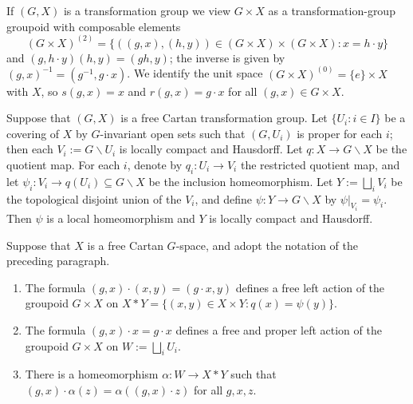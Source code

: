 \documentclass[12pt,a4paper]{amsart}
\newcommand{\under}{\backslash}
\begin{document}
If $(G,X)$ is a transformation group we view $G\times X$ as a
transformation-group groupoid with composable elements
\[
(G\times X)^{(2)}=\big\{ ((g,x),(h,y))\in
(G\times X)\times (G\times X): x=h\cdot y\big\}
\]
and $(g,h\cdot y)(h,y)=(gh,y)$; the inverse is given by
$(g,x)^{-1}=(g^{-1},g\cdot x)$.  We identify the unit space
$(G\times X)^{(0)}=\{e\}\times X$ with $X$, so $s(g,x)=x$ and
$r(g,x)=g\cdot x$ for all $(g,x) \in G \times X$.

Suppose that $(G,X)$ is a free Cartan transformation group. Let
$\{U_i : i \in I\}$ be a covering of $X$ by $G$-invariant open
sets such that $(G, U_i)$ is proper for each $i$; then each
$V_i:=G\under U_i$ is locally compact and Hausdorff. Let $q:X\to
G\under X$ be the quotient map. For each $i$, denote by
$q_i:U_i\to V_i$ the restricted quotient map, and let
$\psi_i:V_i\to q(U_i)\subseteq G\under X$ be the inclusion
homeomorphism. Let $Y := \bigsqcup_i V_i$ be the topological
disjoint union of the $V_i$, and define $\psi:Y\to G\under X$ by
$\psi|_{V_i}=\psi_i$. Then $\psi$ is a local homeomorphism and
$Y$ is locally compact and Hausdorff.

\begin{lemma}\label{lem-disjoint}
Suppose that $X$ is a free Cartan $G$-space, and adopt the
notation of the preceding paragraph.
\begin{enumerate}
\item The formula $(g,x)\cdot (x,y)=(g\cdot x,y)$  defines
    a  free left action of the groupoid $G\times X$ on
    $X*Y=\{(x,y)\in X\times Y:q(x)=\psi(y)\}$.
\item The formula   $(g,x)\cdot x=g\cdot x$  defines a free
    and proper left action of the groupoid $G\times X$ on
    $W := \bigsqcup_i U_i$.
\item There is a homeomorphism $\alpha : W \to X*Y$ such
    that $(g,x)\cdot \alpha(z)  = \alpha((g,x)\cdot z)$ for
    all $g,x,z$.
\end{enumerate}
\end{lemma}
\end{document}
